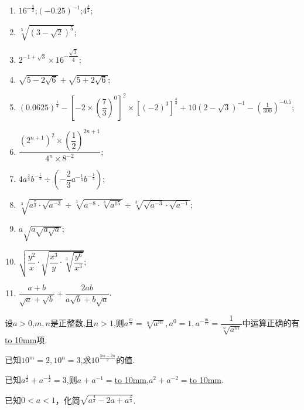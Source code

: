 \documentclass[lang=cn,math=cm,chinesefont=nofont,11pt,scheme=chinese,twocol]{elegantbook}
\begin{document}
\begin{spacing}{1.8}
  \begin{enumerate}
    \item $16^{-\frac{3}{2}}$;$\left(-0.25\right)^{-1}$;$4^{\frac32}$;
    \item $\sqrt[5]{(3-\sqrt{2})^5}$;
    \item $2^{-1+\sqrt{3}}\times16^{-\dfrac{\sqrt{3}}4}$;
    \item $\sqrt{5-2\sqrt6}+\sqrt{5+2\sqrt6}$;
    \item $(0.0625)^{\frac{1}{4}}-\left[-2\times\left(\dfrac{7}{3}\right)^{0}\right]^{2}\times\left[\left(-2\right)^{3}\right]^{\frac{4}{3}}+10\left(2-\sqrt{3}\right)^{-1}-\left(\frac{1}{300}\right)^{-0.5}$;
    \item $\dfrac{\left(2^{n+1}\right)^2\times\left(\dfrac{1}{2}\right)^{2n+1}}{4^n\times8^{-2}}$;
    \item $4a^{\frac{2}{3}}b^{-\frac{1}{3}}\div\left(-\dfrac{2}{3}a^{-\frac{1}{3}}b^{-\frac{1}{3}}\right)$;
    \item $\sqrt[3]{a^{\frac{7}{2}}\cdot\sqrt{a^{-3}}}\div\sqrt[3]{a^{-8}\cdot\sqrt[3]{a^{15}}}\div\sqrt[3]{\sqrt{a^{-3}}\cdot\sqrt{a^{-1}}}$;
    \item $a\sqrt{a\sqrt{a\sqrt{a}}}$;
    \item $\sqrt{\dfrac{y^{2}}{x}\cdot\sqrt{\dfrac{x^{3}}{y}\cdot\sqrt[3]{\dfrac{y^{6}}{x^{3}}}}}$;
    \item $\dfrac{a+b}{\sqrt{a}+\sqrt{b}}+\dfrac{2ab}{a\sqrt{b}+b\sqrt{a}}$.
  \end{enumerate}
\end{spacing}

\begin{exercise}\label{2017RJA_bx1_P109.2.2}
  设$a>0$,$m,n$是正整数,且$n>1$,则$a^{\frac{m}{n}}=\sqrt[n]{a^m} , a^0=1 , a^{-\frac{m}{n}}=\dfrac{1}{\sqrt[n]{a^m}}$中运算正确的有\underline{\hbox to 10mm{}}项.
\end{exercise}

\begin{exercise}\label{2017RJA_bx1_P110.7.1}
  已知$10^m=2,10^n=3$,求$10^{\frac{3m-2n}{2}}$的值.
\end{exercise}

\begin{exercise}
  已知$a^\frac12+a^{-\frac12}=3$,则$a+a^{-1}=$\underline{\hbox to 10mm{}},$a^{2}+a^{-2}=$\underline{\hbox to 10mm{}}.
\end{exercise}

\begin{exercise}\label{2017RJB_bx2_P13.4-1A3}
  已知$0<a<1$，化简$\sqrt{a^{\frac{4}{3}}-2a+a^{\frac{2}{3}}}$.
\end{exercise}
\end{document}
